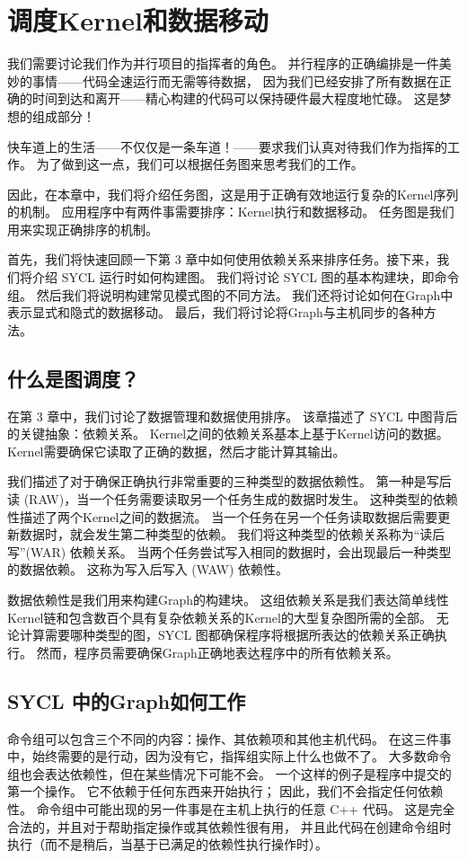 \section{调度Kernel和数据移动}
我们需要讨论我们作为并行项目的指挥者的角色。 
并行程序的正确编排是一件美妙的事情——代码全速运行而无需等待数据，
因为我们已经安排了所有数据在正确的时间到达和离开——精心构建的代码可以保持硬件最大程度地忙碌。 这是梦想的组成部分！

快车道上的生活——不仅仅是一条车道！——要求我们认真对待我们作为指挥的工作。 
为了做到这一点，我们可以根据任务图来思考我们的工作。

因此，在本章中，我们将介绍任务图，这是用于正确有效地运行复杂的Kernel序列的机制。 
应用程序中有两件事需要排序：Kernel执行和数据移动。 任务图是我们用来实现正确排序的机制。

首先，我们将快速回顾一下第 3 章中如何使用依赖关系来排序任务。接下来，我们将介绍 SYCL 运行时如何构建图。 
我们将讨论 SYCL 图的基本构建块，即命令组。 然后我们将说明构建常见模式图的不同方法。 
我们还将讨论如何在Graph中表示显式和隐式的数据移动。 最后，我们将讨论将Graph与主机同步的各种方法。


\subsection{什么是图调度？}
在第 3 章中，我们讨论了数据管理和数据使用排序。 该章描述了 SYCL 中图背后的关键抽象：依赖关系。 
Kernel之间的依赖关系基本上基于Kernel访问的数据。 Kernel需要确保它读取了正确的数据，然后才能计算其输出。

我们描述了对于确保正确执行非常重要的三种类型的数据依赖性。 
第一种是写后读 (RAW)，当一个任务需要读取另一个任务生成的数据时发生。 这种类型的依赖性描述了两个Kernel之间的数据流。 
当一个任务在另一个任务读取数据后需要更新数据时，就会发生第二种类型的依赖。 
我们将这种类型的依赖关系称为“读后写”(WAR) 依赖关系。 
当两个任务尝试写入相同的数据时，会出现最后一种类型的数据依赖。 这称为写入后写入 (WAW) 依赖性。

数据依赖性是我们用来构建Graph的构建块。 
这组依赖关系是我们表达简单线性Kernel链和包含数百个具有复杂依赖关系的Kernel的大型复杂图所需的全部。 
无论计算需要哪种类型的图，SYCL 图都确保程序将根据所表达的依赖关系正确执行。 
然而，程序员需要确保Graph正确地表达程序中的所有依赖关系。

\subsection{SYCL 中的Graph如何工作}
命令组可以包含三个不同的内容：操作、其依赖项和其他主机代码。 
在这三件事中，始终需要的是行动，因为没有它，指挥组实际上什么也做不了。 
大多数命令组也会表达依赖性，但在某些情况下可能不会。 一个这样的例子是程序中提交的第一个操作。 
它不依赖于任何东西来开始执行； 因此，我们不会指定任何依赖性。 
命令组中可能出现的另一件事是在主机上执行的任意 C++ 代码。 
这是完全合法的，并且对于帮助指定操作或其依赖性很有用，
并且此代码在创建命令组时执行（而不是稍后，当基于已满足的依赖性执行操作时）。

